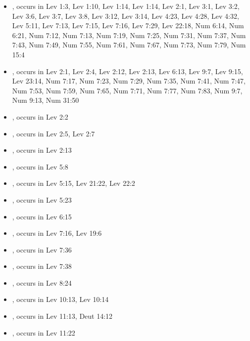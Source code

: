 \documentclass[14pt]{article}
\begin{document}
\begin{itemize}
\item {}, occurs in Lev 1:3, Lev 1:10, Lev 1:14, Lev 1:14, Lev 2:1, Lev 3:1, Lev 3:2, Lev 3:6, Lev 3:7, Lev 3:8, Lev 3:12, Lev 3:14, Lev 4:23, Lev 4:28, Lev 4:32, Lev 5:11, Lev 7:13, Lev 7:15, Lev 7:16, Lev 7:29, Lev 22:18, Num 6:14, Num 6:21, Num 7:12, Num 7:13, Num 7:19, Num 7:25, Num 7:31, Num 7:37, Num 7:43, Num 7:49, Num 7:55, Num 7:61, Num 7:67, Num 7:73, Num 7:79, Num 15:4

\item {}, occurs in Lev 2:1, Lev 2:4, Lev 2:12, Lev 2:13, Lev 6:13, Lev 9:7, Lev 9:15, Lev 23:14, Num 7:17, Num 7:23, Num 7:29, Num 7:35, Num 7:41, Num 7:47, Num 7:53, Num 7:59, Num 7:65, Num 7:71, Num 7:77, Num 7:83, Num 9:7, Num 9:13, Num 31:50

\item {}, occurs in Lev 2:2

\item {}, occurs in Lev 2:5, Lev 2:7

\item {}, occurs in Lev 2:13

\item {}, occurs in Lev 5:8

\item {}, occurs in Lev 5:15, Lev 21:22, Lev 22:2

\item {}, occurs in Lev 5:23

\item {}, occurs in Lev 6:15

\item {}, occurs in Lev 7:16, Lev 19:6

\item {}, occurs in Lev 7:36

\item {}, occurs in Lev 7:38

\item {}, occurs in Lev 8:24

\item {}, occurs in Lev 10:13, Lev 10:14

\item {}, occurs in Lev 11:13, Deut 14:12

\item {}, occurs in Lev 11:22


\end{itemize}
\end{document}
